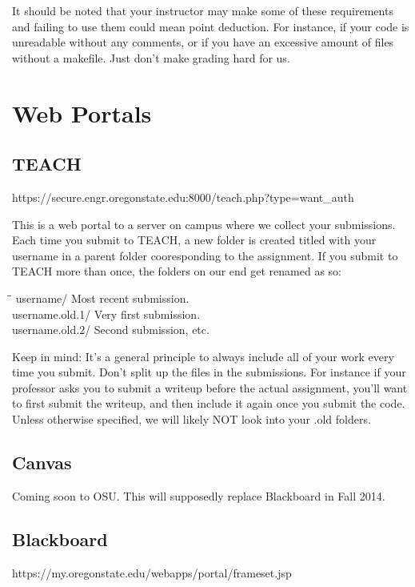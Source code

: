 \documentclass[letterpaper,10pt,titlepage,fleqn]{article}
\begin{document}
It should be noted that your instructor may make some of these requirements and 
failing to use them could mean point deduction. For instance, if your code is
unreadable without any comments, or if you have an excessive amount of files
without a makefile. Just don’t make grading hard for us.




\section{Web Portals}


\subsection{TEACH}
https://secure.engr.oregonstate.edu:8000/teach.php?type=want\_auth

This is a web portal to a server on campus where we collect your submissions. Each
time you submit to TEACH, a new folder is created titled with your username in a
 parent folder cooresponding to the assignment. If you submit to TEACH more than once, the folders
on our end get renamed as so:

\begin{tabbing}
\hspace*{2cm}\=\hspace*{3cm}\= \kill
username/ 		\>\> Most recent submission. \\
username.old.1/ \>\> Very first submission. \\
username.old.2/ \>\> Second submission, etc. \\
\end{tabbing}

Keep in mind: It’s a general principle to always include all of your work every
time you submit. Don’t split up the files in the submissions. For instance if
your professor asks you to submit a writeup before the actual assignment, you'll
want to first submit the writeup, and then include it again once you submit the
code. Unless otherwise specified, we will likely NOT look into your .old folders.


\subsection{Canvas}
Coming soon to OSU. This will supposedly replace Blackboard in Fall 2014. 


\subsection{Blackboard}
https://my.oregonstate.edu/webapps/portal/frameset.jsp
\end{document}
